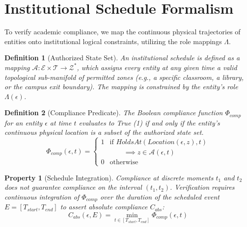 \documentclass[conference]{IEEEtran}
\newtheorem{definition}{Definition}
\newtheorem{property}{Property}
\newcommand{\E}{\mathcal{E}} %
\newcommand{\Z}{\mathcal{Z}} %
\newcommand{\T}{\mathcal{T}} %
\newcommand{\Auth}{\mathcal{A}} %
\begin{document}
\section{Institutional Schedule Formalism}

To verify academic compliance, we map the continuous physical trajectories of entities onto institutional logical constraints, utilizing the role mappings $\Lambda$.

\begin{definition}[Authorized State Set]
An institutional schedule is defined as a mapping $\Auth: \E \times \T \to \Z^*$, which assigns every entity at any given time a valid topological sub-manifold of permitted zones (e.g., a specific classroom, a library, or the campus exit boundary). The mapping is constrained by the entity's role $\Lambda(\epsilon)$.
\end{definition}

\begin{definition}[Compliance Predicate]
The Boolean compliance function $\Phi_{comp}$ for an entity $\epsilon$ at time $t$ evaluates to True (1) if and only if the entity's continuous physical location is a subset of the authorized state set.
\begin{equation}
\Phi_{comp}(\epsilon, t) = \begin{cases} 
1 & \text{if } HoldsAt(Location(\epsilon, z), t) \\
  & \qquad \implies z \in \Auth(\epsilon, t) \\
0 & \text{otherwise} 
\end{cases}
\end{equation}
\end{definition}

\begin{property}[Schedule Integration]
Compliance at discrete moments $t_1$ and $t_2$ does not guarantee compliance on the interval $(t_1, t_2)$. Verification requires continuous integration of $\Phi_{comp}$ over the duration of the scheduled event $E = [T_{start}, T_{end}]$ to assert absolute compliance $C_{abs}$:
\begin{equation}
C_{abs}(\epsilon, E) = \min_{t \in [T_{start}, T_{end}]} \Phi_{comp}(\epsilon, t)
\end{equation}
\end{property}

\end{document}
